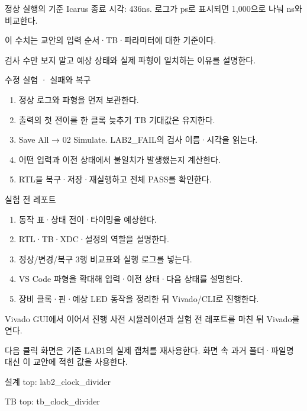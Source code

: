 \begin{frame}{정상 실행의 기준}
\small
{}Icarus 종료 시각: 436ns. 로그가 ps로 표시되면 1,000으로 나눠 ns와 비교한다.\par\vspace{0.26cm}이 수치는 교안의 입력 순서·TB·파라미터에 대한 기준이다.\par\vspace{0.26cm}검사 수만 보지 말고 예상 상태와 실제 파형이 일치하는 이유를 설명한다.\par
\end{frame}

\begin{frame}{수정 실험 · 실패와 복구}
\small
\begin{enumerate}
\item 정상 로그와 파형을 먼저 보관한다.
\item 출력의 첫 전이를 한 클록 늦추기 TB 기대값은 유지한다.
\item Save All → 02 Simulate. LAB2\_FAIL의 검사 이름·시각을 읽는다.
\item 어떤 입력과 이전 상태에서 불일치가 발생했는지 계산한다.
\item RTL을 복구·저장·재실행하고 전체 PASS를 확인한다.
\end{enumerate}
\end{frame}

\begin{frame}[label=reports]{실험 전 레포트}
\small
\begin{enumerate}
\item 동작 표·상태 전이·타이밍을 예상한다.
\item RTL·TB·XDC·설정의 역할을 설명한다.
\item 정상/변경/복구 3행 비교표와 실행 로그를 넣는다.
\item VS Code 파형을 확대해 입력·이전 상태·다음 상태를 설명한다.
\item 장비 클록·핀·예상 LED 동작을 정리한 뒤 Vivado/CLI로 진행한다.
\end{enumerate}
\end{frame}

\begin{frame}[label=implementation]{Vivado GUI에서 이어서 진행}
\small
사전 시뮬레이션과 실험 전 레포트를 마친 뒤 Vivado를 연다.\par\vspace{0.26cm}다음 클릭 화면은 기존 LAB1의 실제 캡처를 재사용한다. 화면 속 과거 폴더·파일명 대신 이 교안에 적힌 값을 사용한다.\par\vspace{0.26cm}설계 top: lab2\_clock\_divider\par\vspace{0.26cm}TB top: tb\_clock\_divider\par
\end{frame}

